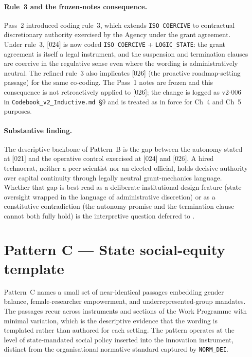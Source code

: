 \paragraph{Rule~3 and the frozen-notes consequence.}
Pass~2 introduced coding rule~3, which extends \texttt{ISO\_COERCIVE}
to contractual discretionary authority exercised by the Agency under
the grant agreement. Under rule~3, [024] is now coded
\texttt{ISO\_COERCIVE} + \texttt{LOGIC\_STATE}: the grant agreement
is itself a legal instrument, and the suspension and termination
clauses are coercive in the regulative sense even where the wording
is administratively neutral. The refined rule~3 also implicates [026]
(the proactive roadmap-setting passage) for the same co-coding. The
Pass~1 notes are frozen and this consequence is not retroactively
applied to [026]; the change is logged as v2-006 in
\texttt{Codebook\_v2\_Inductive.md}~\S9 and is treated as in force for
Ch~4 and Ch~5 purposes.

\paragraph{Substantive finding.}
The descriptive backbone of Pattern~B is the gap between the
autonomy stated at [021] and the operative control exercised at [024]
and [026]. A hired technocrat, neither a peer scientist nor an
elected official, holds decisive authority over capital continuity
through legally neutral grant-mechanics language. Whether that gap is
best read as a deliberate institutional-design feature (state
oversight wrapped in the language of administrative discretion) or as
a constitutive contradiction (the autonomy promise and the
termination clause cannot both fully hold) is the interpretive
question deferred to .

\section{Pattern C --- State social-equity template}
\label{sec:res-pattern-c}

Pattern~C names a small set of near-identical passages embedding
gender balance, female-researcher empowerment, and
underrepresented-group mandates. The passages recur across
instruments and sections of the Work Programme with minimal
variation, which is the descriptive evidence that the wording is
templated rather than authored for each setting. The pattern operates
at the level of state-mandated social policy inserted into the
innovation instrument, distinct from the organisational normative
standard captured by \texttt{NORM\_DEI}.

